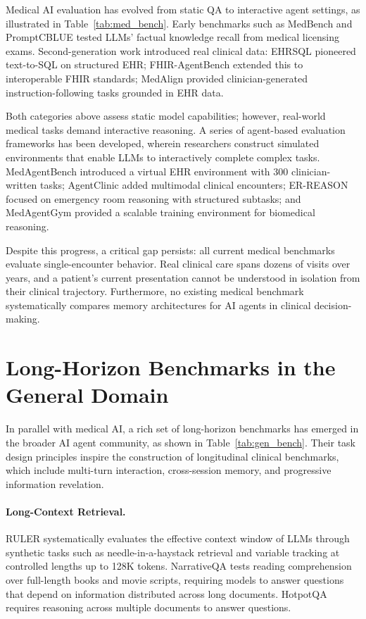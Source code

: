 Medical AI evaluation has evolved from static QA to interactive agent settings, as illustrated in Table~\ref{tab:med_bench}. Early benchmarks such as MedBench \cite{2023_medbench} and PromptCBLUE \cite{2023_promptcblue} tested LLMs' factual knowledge recall from medical licensing exams. Second-generation work introduced real clinical data: EHRSQL \cite{lee2022ehrsql} pioneered text-to-SQL on structured EHR; FHIR-AgentBench \cite{2025_fhir_agentbench} extended this to interoperable FHIR standards; MedAlign \cite{2024_medalign} provided clinician-generated instruction-following tasks grounded in EHR data.

Both categories above assess static model capabilities; however, real-world medical tasks demand interactive reasoning. A series of agent-based evaluation frameworks has been developed, wherein researchers construct simulated environments that enable LLMs to interactively complete complex tasks. MedAgentBench \cite{jiang2025medagentbench} introduced a virtual EHR environment with 300 clinician-written tasks; AgentClinic \cite{schmidgall2025agentclinicmultimodalagentbenchmark} added multimodal clinical encounters; ER-REASON \cite{2025_er_reason} focused on emergency room reasoning with structured subtasks; and MedAgentGym \cite{2025_medagentgym} provided a scalable training environment for biomedical reasoning.

Despite this progress, a critical gap persists: all current medical benchmarks evaluate single-encounter behavior. Real clinical care spans dozens of visits over years, and a patient's current presentation cannot be understood in isolation from their clinical trajectory. Furthermore, no existing medical benchmark systematically compares memory architectures for AI agents in clinical decision-making.

\section{Long-Horizon Benchmarks in the General Domain}

In parallel with medical AI, a rich set of long-horizon benchmarks has emerged in the broader AI agent community, as shown in Table~\ref{tab:gen_bench}. Their task design principles inspire the construction of longitudinal clinical benchmarks, which include multi-turn interaction, cross-session memory, and progressive information revelation. 

\paragraph{Long-Context Retrieval.} RULER \cite{hsieh2024rulerwhatsrealcontext} systematically evaluates the effective context window of LLMs through synthetic tasks such as needle-in-a-haystack retrieval and variable tracking at controlled lengths up to 128K tokens. NarrativeQA \cite{kočiský2017narrativeqareadingcomprehensionchallenge} tests reading comprehension over full-length books and movie scripts, requiring models to answer questions that depend on information distributed across long documents. HotpotQA \cite{yang2018hotpotqa} requires reasoning across multiple documents to answer questions. 

